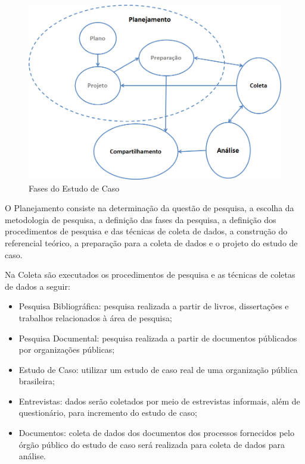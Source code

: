 	\begin{figure}[htb]
		\centering
		
			\includegraphics[scale=0.6]{figuras/fasesestudo.png}
		\caption{Fases do Estudo de Caso}
		\label{fases}
	\end{figure}

O Planejamento consiste na determinação da questão de pesquisa, a escolha da metodologia de pesquisa, a definição das fases da pesquisa,  a definição dos procedimentos de pesquisa e das técnicas de coleta de dados, a construção do referencial teórico, a preparação para a coleta de dados e o projeto do estudo de caso.


Na Coleta são executados os procedimentos de pesquisa e as técnicas de coletas de dados a seguir:

\begin{itemize}
\item Pesquisa Bibliográfica: pesquisa realizada a partir de livros, dissertações e trabalhos relacionados à área de pesquisa;
\item Pesquisa Documental: pesquisa realizada a partir de documentos públicados por organizações públicas;
\item Estudo de Caso: utilizar um estudo de caso real de uma organização pública brasileira;
\item Entrevistas: dados serão coletados por meio de estrevistas informais, além de questionário, para incremento do estudo de caso;
\item Documentos: coleta de dados dos documentos dos processos fornecidos pelo órgão público do estudo de caso será realizada para coleta de dados para análise.
\end{itemize}

